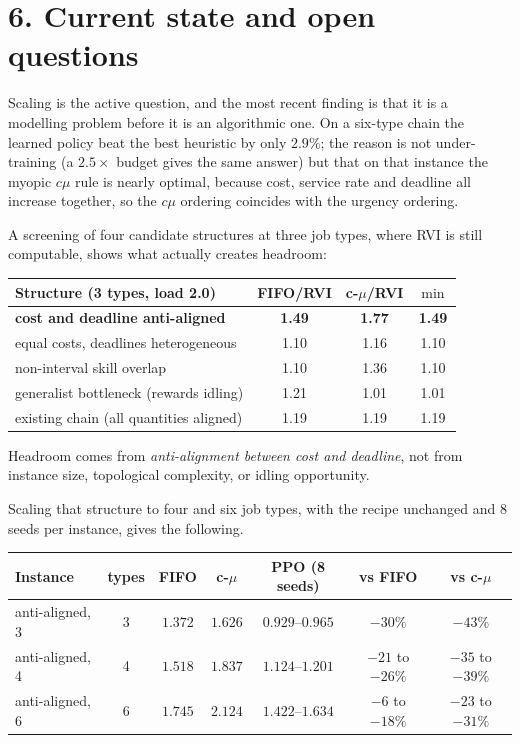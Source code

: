 \documentclass[11pt,a4paper]{article}
\begin{document}
\section*{6. Current state and open questions}

Scaling is the active question, and the most recent finding is that it is a
modelling problem before it is an algorithmic one.  On a six-type chain the
learned policy beat the best heuristic by only $2.9\%$; the reason is not
under-training (a $2.5\times$ budget gives the same answer) but that on that
instance the myopic $c\mu$ rule is nearly optimal, because cost, service rate
and deadline all increase together, so the $c\mu$ ordering coincides with the
urgency ordering.

A screening of four candidate structures at three job types, where RVI is still
computable, shows what actually creates headroom:

\begin{center}
\begin{tabular}{lccc}
\toprule
Structure (3 types, load 2.0) & FIFO/RVI & c-$\mu$/RVI & $\min$ \\
\midrule
\textbf{cost and deadline anti-aligned} & \textbf{1.49} & \textbf{1.77} & \textbf{1.49} \\
equal costs, deadlines heterogeneous & 1.10 & 1.16 & 1.10 \\
non-interval skill overlap & 1.10 & 1.36 & 1.10 \\
generalist bottleneck (rewards idling) & 1.21 & 1.01 & 1.01 \\
\midrule
existing chain (all quantities aligned) & 1.19 & 1.19 & 1.19 \\
\bottomrule
\end{tabular}
\end{center}

Headroom comes from \emph{anti-alignment between cost and deadline}, not from
instance size, topological complexity, or idling opportunity.

Scaling that structure to four and six job types, with the recipe unchanged and
8 seeds per instance, gives the following.

\begin{center}
\begin{tabular}{lcccccc}
\toprule
Instance & types & FIFO & c-$\mu$ & PPO (8 seeds) & vs FIFO & vs c-$\mu$ \\
\midrule
anti-aligned, 3 & 3 & $1.372$ & $1.626$ & $0.929$--$0.965$ & $-30\%$ & $-43\%$ \\
anti-aligned, 4 & 4 & $1.518$ & $1.837$ & $1.124$--$1.201$ & $-21$ to $-26\%$ & $-35$ to $-39\%$ \\
anti-aligned, 6 & 6 & $1.745$ & $2.124$ & $1.422$--$1.634$ & $-6$ to $-18\%$  & $-23$ to $-31\%$ \\
\bottomrule
\end{tabular}
\end{center}
\end{document}
